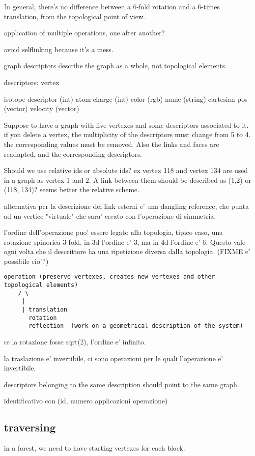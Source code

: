\documentclass[a4paper,12pt,oneside]{book}
\begin{document}
In general, there's no difference between a 6-fold rotation and a 6-times
translation, from the topological point of view.

application of multiple operations, one after another?

avoid selflinking because it's a mess.

graph descriptors describe the graph as a whole, not topological elements.


descriptors: vertex

isotope descriptor (int)
atom charge (int)
color (rgb)
name (string)
cartesian pos (vector)
velocity (vector)


Suppose to have a graph with five vertexes and some descriptors associated
to it. if you delete a vertex, the multiplicity of the descriptors must
change from 5 to 4. the corresponding values must be removed. Also the links
and faces are readapted, and the corresponding descriptors.

Should we use relative ids or absolute ids? ex vertex 118 and vertex 134 are
used in a graph as vertex 1 and 2. A link between them should be described
as (1,2) or (118, 134)? seems better the relative scheme.

alternativa per la descrizione dei link esterni e' una dangling reference,
che punta ad un vertice "virtuale" che sara' creato con l'operazione di
simmetria.

l'ordine dell'operazione puo' essere legato alla topologia, tipico caso, una
rotazione spinorica 3-fold, in 3d l'ordine e' 3, ma in 4d l'ordine e' 6.
Questo vale ogni volta che il descrittore ha una ripetizione diversa dalla
topologia. (FIXME e' possibile cio'?)

\begin{verbatim}
operation (preserve vertexes, creates new vertexes and other topological elements)
    / \
     |
     | translation
       rotation
       reflection  (work on a geometrical description of the system)

\end{verbatim}

se la rotazione fosse sqrt(2), l'ordine e' infinito. 

la traslazione e' invertibile, ci sono operazioni per le quali l'operazione
e' invertibile.

descriptors belonging to the same description should point to the same
graph.

identificativo con (id, numero applicazioni operazione)


\subsection{traversing}
in a forest, we need to have starting vertexes for each block.
\end{document}
